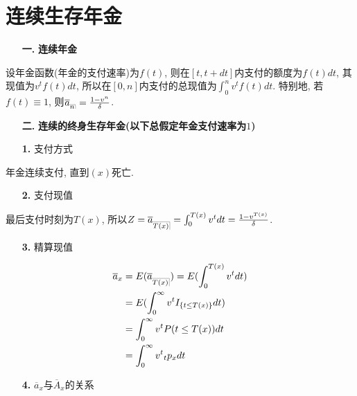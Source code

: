 \documentclass[a4paper,10pt]{ctexbook}
\makeatletter
\newcommand{\hei}{\CJKfamily{hei}}      %
\DeclareRobustCommand{\annu}[1]{_{%
    \def\arraystretch{0}%
    \setlength\arraycolsep{1pt}%
    \setlength\arrayrulewidth{.2pt}%
    \begin{array}[b]{@{}c|}\hline
        \\[\arraycolsep]%
        \scriptstyle #1%
    \end{array}%
}}
\makeatother
\begin{document}
\section{连续生存年金}
\begin{itemize}
    \item[{\bf\hei 一.}]{\bf\hei 连续年金}
\end{itemize}

设年金函数(年金的支付速率)为$f(t)$, 则在$[t,t+dt]$内支付的额度为$f(t)dt$, 其现值为$v^tf(t)dt$, 所以在$[0,n]$内支付的总现值为$\int_0^n v^tf(t)dt$. 特别地, 若$f(t) \equiv 1$, 则$\overline{a}_{\annu n} = \frac{1-v^n}{\delta}$.

\begin{itemize}
    \item[{\bf\hei 二.}]{\bf\hei 连续的终身生存年金(以下总假定年金支付速率为$1$)}
\end{itemize}

\begin{itemize}
    \item[{\bf\hei 1.}] 支付方式
\end{itemize}

年金连续支付, 直到$(x)$死亡.

\begin{itemize}
    \item[{\bf\hei 2.}] 支付现值
\end{itemize}

最后支付时刻为$T(x)$, 所以$Z = \overline{a}_{\annu{T(x)}} = \int_0^{T(x)} v^tdt = \frac{1-v^{T(x)}}{\delta}$.

\begin{itemize}
    \item[{\bf\hei 3.}] 精算现值
\end{itemize}

\begin{align*}
    \overline{a}_x & = E(\overline{a}_{\annu{T(x)}}) = E(\int_0^{T(x)} v^tdt) \\
                   & = E(\int_0^{\infty} v^tI_{\{t \leq T(x)\}}dt)            \\
                   & = \int_0^{\infty} v^tP(t \leq T(x))dt                    \\
                   & = \int_0^{\infty} v^t{}_{t}p_xdt
\end{align*}

\begin{itemize}
    \item[{\bf\hei 4.}] $\overline{a}_x$与$\overline{A}_x$的关系
\end{itemize}
\end{document}
